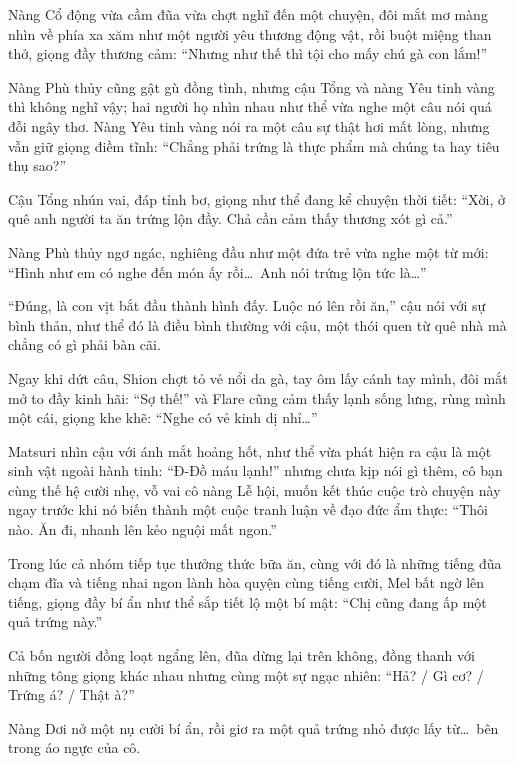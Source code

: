 \documentclass[../main.tex]{subfiles}
\begin{document}
Nàng Cổ động vừa cầm đũa vừa chợt nghĩ đến một chuyện, đôi mắt mơ màng nhìn về phía xa xăm như một người yêu thương động vật, rồi buột miệng than thở, giọng đầy thương cảm: ``Nhưng như thế thì tội cho mấy chú gà con lắm!''

Nàng Phù thủy cũng gật gù đồng tình, nhưng cậu Tổng và nàng Yêu tinh vàng thì không nghĩ vậy; hai người họ nhìn nhau như thể vừa nghe một câu nói quá đỗi ngây thơ. Nàng Yêu tinh vàng nói ra một câu sự thật hơi mất lòng, nhưng vẫn giữ giọng điềm tĩnh: ``Chẳng phải trứng là thực phẩm mà chúng ta hay tiêu thụ sao?''

Cậu Tổng nhún vai, đáp tỉnh bơ, giọng như thể đang kể chuyện thời tiết: ``Xời, ở quê anh người ta ăn trứng lộn đầy. Chả cần cảm thấy thương xót gì cả.''

Nàng Phù thủy ngơ ngác, nghiêng đầu như một đứa trẻ vừa nghe một từ mới: ``Hình như em có nghe đến món ấy rồi\dots\ Anh nói trứng lộn tức là\dots''

``Đúng, là con vịt bắt đầu thành hình đấy. Luộc nó lên rồi ăn,'' cậu nói với sự bình thản, như thể đó là điều bình thường với cậu, một thói quen từ quê nhà mà chẳng có gì phải bàn cãi.

Ngay khi dứt câu, Shion chợt tỏ vẻ nổi da gà, tay ôm lấy cánh tay mình, đôi mắt mở to đầy kinh hãi: ``Sợ thế!'' và Flare cũng cảm thấy lạnh sống lưng, rùng mình một cái, giọng khe khẽ: ``Nghe có vẻ kinh dị nhỉ\dots''

Matsuri nhìn cậu với ánh mắt hoảng hốt, như thể vừa phát hiện ra cậu là một sinh vật ngoài hành tinh: ``Đ-Đồ máu lạnh!'' nhưng chưa kịp nói gì thêm, cô bạn cùng thế hệ cười nhẹ, vỗ vai cô nàng Lễ hội, muốn kết thúc cuộc trò chuyện này ngay trước khi nó biến thành một cuộc tranh luận về đạo đức ẩm thực: ``Thôi nào. Ăn đi, nhanh lên kẻo nguội mất ngon.''

\ct

Trong lúc cả nhóm tiếp tục thưởng thức bữa ăn, cùng với đó là những tiếng đũa chạm đĩa và tiếng nhai ngon lành hòa quyện cùng tiếng cười, Mel bất ngờ lên tiếng, giọng đầy bí ẩn như thể sắp tiết lộ một bí mật: ``Chị cũng đang ấp một quả trứng này.''

Cả bốn người đồng loạt ngẩng lên, đũa dừng lại trên không, đồng thanh với những tông giọng khác nhau nhưng cùng một sự ngạc nhiên: ``Hả? / Gì cơ? / Trứng á? / Thật à?''

Nàng Dơi nở một nụ cười bí ẩn, rồi giơ ra một quả trứng nhỏ được lấy từ\dots\ bên trong áo ngực của cô.

\end{document}
